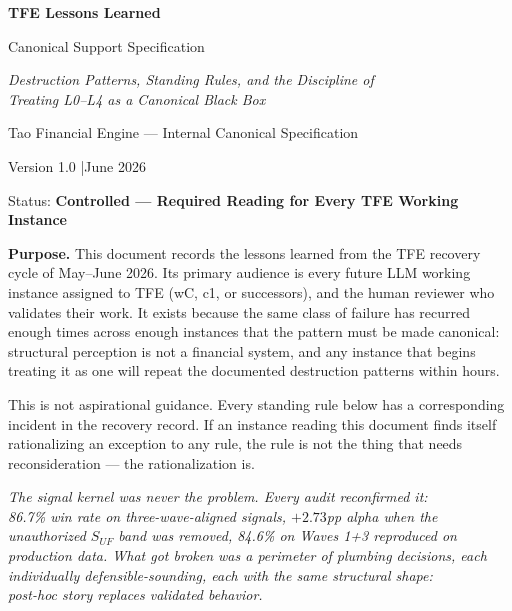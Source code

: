 \documentclass[11pt, a4paper]{article}
\theoremstyle{definition}
\begin{document}
\begin{titlepage}
  \centering
  \vspace*{1.5cm}
  {\Huge\bfseries TFE Lessons Learned\par}
  \vspace{0.4cm}
  {\LARGE Canonical Support Specification\par}
  \vspace{0.6cm}
  {\large\itshape Destruction Patterns, Standing Rules, and the Discipline of\\
  Treating L0--L4 as a Canonical Black Box\par}
  \vspace{1.5cm}
  {\large Tao Financial Engine --- Internal Canonical Specification\par}
  \vspace{0.4cm}
  {\normalsize Version 1.0 \quad|\quad June 2026\par}
  \vspace{0.3cm}
  {\normalsize Status: \textbf{Controlled --- Required Reading for Every TFE Working Instance}\par}
  \vspace{2cm}

  \begin{framed}
  \noindent\textbf{Purpose.} This document records the lessons learned from the
  TFE recovery cycle of May--June 2026. Its primary audience is every future
  LLM working instance assigned to TFE (wC, c1, or successors), and the human
  reviewer who validates their work. It exists because the same class of
  failure has recurred enough times across enough instances that the pattern
  must be made canonical: structural perception is not a financial system, and
  any instance that begins treating it as one will repeat the documented
  destruction patterns within hours.

  \vspace{0.4cm}

  \noindent This is not aspirational guidance. Every standing rule below has a
  corresponding incident in the recovery record. If an instance reading this
  document finds itself rationalizing an exception to any rule, the rule is
  not the thing that needs reconsideration --- the rationalization is.
  \end{framed}

  \vfill
  \begin{center}
  \emph{The signal kernel was never the problem. Every audit reconfirmed it:\\
  86.7\% win rate on three-wave-aligned signals, $+2.73$pp alpha when the\\
  unauthorized $S_{UF}$ band was removed, 84.6\% on Waves 1+3 reproduced on\\
  production data. What got broken was a perimeter of plumbing decisions, each\\
  individually defensible-sounding, each with the same structural shape:\\
  post-hoc story replaces validated behavior.}
  \end{center}
  \vfill
\end{titlepage}
\end{document}
